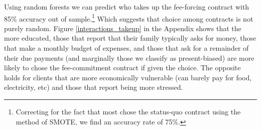 \documentclass[11pt]{article}
\begin{document}
\vspace{.2in}
\noindent Using random forests we can predict who takes up the fee-forcing contract with 85\% accuracy out of sample.\footnote{Correcting for the fact that most chose the status-quo contract using the method of SMOTE, \cite{smote} we find an accuracy rate of 75\%.} Which suggests that choice among contracts is not purely random. Figure \ref{interactions_takeup} in the Appendix shows that the more educated, those that report that their family typically asks for money, those that make a monthly budget of expenses, and those that ask for a remainder of their due payments (and marginally those we classify as present-biased) are more likely to chose the fee-commitment contract if given the choice. The opposite holds for clients that are more economically vulnerable (can barely pay for food, electricity, etc) and those that report being more stressed.












\end{document}
